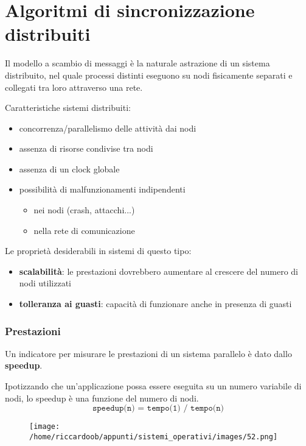 \chapter{Algoritmi di sincronizzazione distribuiti}
Il modello a scambio di messaggi è la naturale astrazione di un sistema distribuito, nel quale processi distinti eseguono su nodi fisicamente separati e collegati tra loro attraverso una rete.

Caratteristiche sistemi distribuiti:
\begin{itemize}
    \item concorrenza/parallelismo delle attività dai nodi
    \item assenza di risorse condivise tra nodi
    \item assenza di un clock globale
    \item possibilità di malfunzionamenti indipendenti
    \begin{itemize}
        \item nei nodi (crash, attacchi...)
        \item nella rete di comunicazione
    \end{itemize}
\end{itemize}

Le proprietà desiderabili in sistemi di questo tipo:
\begin{itemize}
    \item \textbf{scalabilità}: le prestazioni dovrebbero aumentare al crescere del numero di nodi utilizzati
    \item \textbf{tolleranza ai guasti}: capacità di funzionare anche in presenza di guasti
\end{itemize}

\subsection{Prestazioni}
Un indicatore per misurare le prestazioni di un sistema parallelo è dato dallo \textbf{speedup}.

Ipotizzando che un'applicazione possa essere eseguita su un numero variabile di nodi, lo speedup è una funzione del numero di nodi.
\begin{equation*}
\texttt{speedup(n) = tempo(1) / tempo(n)}
\end{equation*}

\begin{figure}[H]
    \centering
    \texttt{[image: /home/riccardoob/appunti/sistemi\_operativi/images/52.png]}
\end{figure}

